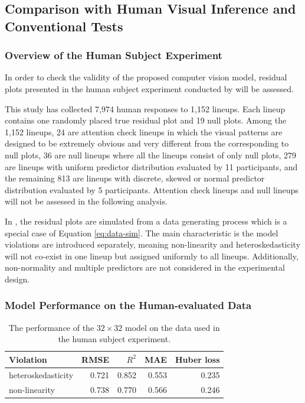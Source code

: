 \documentclass[]{interact}
\theoremstyle{plain}%
\theoremstyle{definition}
\theoremstyle{remark}
\begin{document}
\subsection{Comparison with Human Visual Inference and Conventional
Tests}\label{comparison-with-human-visual-inference-and-conventional-tests}

\subsubsection{Overview of the Human Subject
Experiment}\label{overview-of-the-human-subject-experiment}

In order to check the validity of the proposed computer vision model,
residual plots presented in the human subject experiment conducted by
\citet{li2024plot} will be assessed.

This study has collected 7,974 human responses to 1,152 lineups. Each
lineup contains one randomly placed true residual plot and 19 null
plots. Among the 1,152 lineups, 24 are attention check lineups in which
the visual patterns are designed to be extremely obvious and very
different from the corresponding to null plots, 36 are null lineups
where all the lineups consist of only null plots, 279 are lineups with
uniform predictor distribution evaluated by 11 participants, and the
remaining 813 are lineups with discrete, skewed or normal predictor
distribution evaluated by 5 participants. Attention check lineups and
null lineups will not be assessed in the following analysis.

In \citet{li2024plot}, the residual plots are simulated from a data
generating process which is a special case of Equation
\ref{eq:data-sim}. The main characteristic is the model violations are
introduced separately, meaning non-linearity and heteroskedasticity will
not co-exist in one lineup but assigned uniformly to all lineups.
Additionally, non-normality and multiple predictors are not considered
in the experimental design.

\subsubsection{Model Performance on the Human-evaluated
Data}\label{model-performance-on-the-human-evaluated-data}

\begin{table}

\caption{\label{tab:experiment-performance}The performance of the $32 \times 32$ model on the data used in the human subject experiment.}
\centering
\begin{tabular}[t]{lrrrr}
\toprule
Violation & RMSE & $R^2$ & MAE & Huber loss\\
\midrule
heteroskedasticity & 0.721 & 0.852 & 0.553 & 0.235\\
non-linearity & 0.738 & 0.770 & 0.566 & 0.246\\
\bottomrule
\end{tabular}
\end{table}
\end{document}
